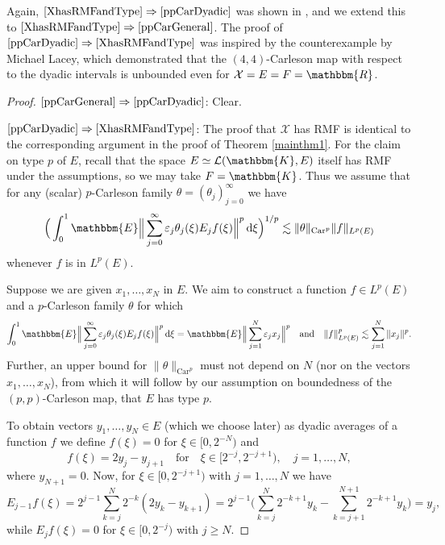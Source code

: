 \documentclass[a4paper,10pt]{amsart}
\theoremstyle{plain}
\theoremstyle{definition}
\theoremstyle{remark}
\begin{document}
Again, $\eqref{XhasRMFandType}\Rightarrow\eqref{ppCarDyadic}$ was shown in \cite{HMP}, and we extend this to $\eqref{XhasRMFandType}\Rightarrow\eqref{ppCarGeneral}$. The proof of $\eqref{ppCarDyadic}\Rightarrow\eqref{XhasRMFandType}$ was inspired by the counterexample by Michael Lacey, which demonstrated that the $(4,4)$-Carleson map with respect to the dyadic intervals is unbounded even for $\mathcal{X}=E=F={\mathbbm{R}}$.

  \begin{proof}
    $\eqref{ppCarGeneral}\Rightarrow\eqref{ppCarDyadic}$: Clear.

    $\eqref{ppCarDyadic}\Rightarrow\eqref{XhasRMFandType}$:
    The proof that $\mathcal{X}$ has RMF is identical to the corresponding
    argument in the proof of Theorem \ref{mainthm1}. For the claim on type $p$ of $E$, recall that the space $E\simeq\mathcal{L}({\mathbbm{K}},E)$ itself has RMF under the assumptions, so we may take $F={\mathbbm{K}}$.
    Thus we assume that for any (scalar) $p$-Carleson family $\theta = (\theta_j)_{j=0}^{\infty}$ we have
    \begin{equation*}
      \Big( \int_0^1 {\mathbbm{E}} \Big\| \sum_{j=0}^{\infty} \varepsilon_j \theta_j(\xi ) E_jf(\xi) \Big\| ^p {\,\text{d}}\xi \Big)^{1/p}
      \lesssim \| \theta \|_{\text{Car}^p} \| f \|_{L^p(E)}
    \end{equation*}
    whenever $f$ is in $L^p(E)$.
    
    Suppose we are given $x_1,\ldots , x_N$ in $E$. We aim to construct a function $f\in L^p(E)$
    and a $p$-Carleson family $\theta$ for which
    \begin{equation*}
      \int_0^1 {\mathbbm{E}} \Big\| \sum_{j=0}^{\infty} \varepsilon_j \theta_j(\xi) E_jf(\xi) \Big\|^p {\,\text{d}}\xi
      = {\mathbbm{E}} \Big\| \sum_{j=1}^N \varepsilon_j x_j \Big\|^p
      \quad \text{and} \quad \| f \|_{L^p(E)}^p \lesssim \sum_{j=1}^N \| x_j \|^p .
    \end{equation*}
    Further, an upper bound for $\| \theta \|_{\text{Car}^p}$ must not depend on 
    $N$ (nor on the vectors $x_1, \ldots , x_N$), from which it will follow by our
    assumption on boundedness of the $(p,p)$-Carleson map, that $E$ has type $p$.
    
    To obtain vectors $y_1,\ldots ,y_N \in E$ 
    (which we choose later) as dyadic averages of a function $f$ we 
    define $f(\xi) = 0$ for $\xi\in [0,2^{-N})$ and
    \begin{equation*}
      f(\xi) = 2y_j - y_{j+1} \quad \text{for} \quad \xi\in [2^{-j}, 2^{-j+1}), \quad j=1,\ldots , N,
    \end{equation*}
    where $y_{N+1} = 0$. Now, for $\xi\in [0,2^{-j+1})$ with $j=1,\ldots , N$ we have
    \begin{equation*}
      E_{j-1}f(\xi) = 2^{j-1} \sum_{k=j}^N 2^{-k} (2y_k - y_{k+1}) 
      = 2^{j-1} \Big( \sum_{k=j}^N 2^{-k+1}y_k - \sum_{k=j+1}^{N+1} 2^{-k+1}y_k \Big) = y_j ,
    \end{equation*}
    while $E_jf(\xi) = 0$ for $\xi\in [0,2^{-j})$ with $j \geq N$.
    

\end{proof}
\end{document}
